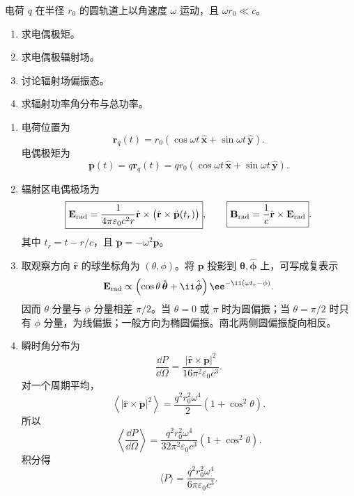 \begin{question}[圆周运动电荷的电偶极辐射]
电荷 $q$ 在半径 $r_0$ 的圆轨道上以角速度 $\omega$ 运动，且 $\omega r_0\ll c$。
\begin{enumerate}
  \item 求电偶极矩。
  \item 求电偶极辐射场。
  \item 讨论辐射场偏振态。
  \item 求辐射功率角分布与总功率。
\end{enumerate}
\begin{solution}
\begin{enumerate}
  \item 电荷位置为
  \[
    \mathbf r_q(t)=r_0(\cos\omega t\,\hat{\mathbf x}+\sin\omega t\,\hat{\mathbf y}) .
  \]
  电偶极矩为
  \[
    \boxed{\mathbf p(t)=q\mathbf r_q(t)
    =qr_0(\cos\omega t\,\hat{\mathbf x}+\sin\omega t\,\hat{\mathbf y})} .
  \]

  \item 辐射区电偶极场为
  \[
    \boxed{\mathbf E_{\rm rad}=\frac{1}{4\pi\varepsilon_0c^2r}
    \hat{\mathbf r}\times\bigl(\hat{\mathbf r}\times\ddot{\mathbf p}(t_r)\bigr)},
    \qquad
    \boxed{\mathbf B_{\rm rad}=\frac1c\hat{\mathbf r}\times\mathbf E_{\rm rad}} .
  \]
  其中 $t_r=t-r/c$，且 $\ddot{\mathbf p}=-\omega^2\mathbf p$。

  \item 取观察方向 $\hat{\mathbf r}$ 的球坐标角为 $(\theta,\phi)$。将 $\mathbf p$ 投影到 $\hat{\boldsymbol\theta},\hat{\boldsymbol\phi}$ 上，可写成复表示
  \[
    \mathbf E_{\rm rad}\propto
    \left(\cos\theta\,\hat{\boldsymbol\theta}+\ii\hat{\boldsymbol\phi}\right)
    \ee^{-\ii(\omega t_r-\phi)} .
  \]
  因而 $\theta$ 分量与 $\phi$ 分量相差 $\pi/2$。当 $\theta=0$ 或 $\pi$ 时为圆偏振；当 $\theta=\pi/2$ 时只有 $\phi$ 分量，为线偏振；一般方向为椭圆偏振。南北两侧圆偏振旋向相反。

  \item 瞬时角分布为
  \[
    \frac{\dd{P}}{\dd{\Omega}}
    =\frac{|\hat{\mathbf r}\times\ddot{\mathbf p}|^2}{16\pi^2\varepsilon_0c^3} .
  \]
  对一个周期平均，
  \[
    \left\langle |\hat{\mathbf r}\times\ddot{\mathbf p}|^2\right\rangle
    =\frac{q^2r_0^2\omega^4}{2}(1+\cos^2\theta) .
  \]
  所以
  \[
    \boxed{\left\langle\frac{\dd{P}}{\dd{\Omega}}\right\rangle
    =\frac{q^2r_0^2\omega^4}{32\pi^2\varepsilon_0c^3}(1+\cos^2\theta)} .
  \]
  积分得
  \[
    \boxed{\langle P\rangle=\frac{q^2r_0^2\omega^4}{6\pi\varepsilon_0c^3}} .
  \]
\end{enumerate}
\end{solution}
\end{question}

